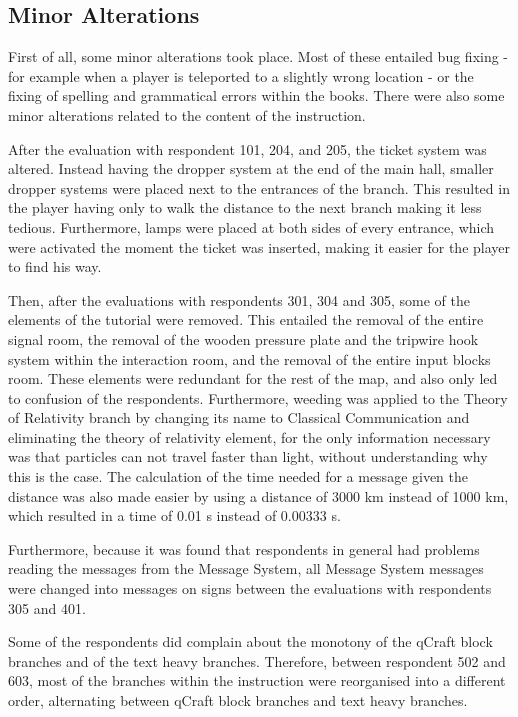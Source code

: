 \documentclass[11pt,twoside]{report} %
\begin{document}
\subsection{Minor Alterations}

First of all, some minor alterations took place. Most of these entailed bug fixing - for example when a player is teleported to a slightly wrong location - or the fixing of spelling and grammatical errors within the books. There were also some minor alterations related to the content of the instruction.

After the evaluation with respondent 101, 204, and 205, the ticket system was altered. Instead having the dropper system at the end of the main hall, smaller dropper systems were placed next to the entrances of the branch. This resulted in the player having only to walk the distance to the next branch making it less tedious. Furthermore, lamps were placed at both sides of every entrance, which were activated the moment the ticket was inserted, making it easier for the player to find his way.

Then, after the evaluations with respondents 301, 304 and 305, some of the elements of the tutorial were removed. This entailed the removal of the entire signal room, the removal of the wooden pressure plate and the tripwire hook system within the interaction room, and the removal of the entire input blocks room. These elements were redundant for the rest of the map, and also only led to confusion of the respondents. Furthermore, weeding was applied to the Theory of Relativity branch by changing its name to Classical Communication and eliminating the theory of relativity element, for the only information necessary was that particles can not travel faster than light, without understanding why this is the case. The calculation of the time needed for a message given the distance was also made easier by using a distance of 3000 km instead of 1000 km, which resulted in a time of 0.01 s instead of 0.00333 s.

Furthermore, because it was found that respondents in general had problems reading the messages from the Message System, all Message System messages were changed into messages on signs between the evaluations with respondents 305 and 401.

Some of the respondents did complain about the monotony of the qCraft block branches and of the text heavy branches. Therefore, between respondent 502 and 603, most of the branches within the instruction were reorganised into a different order, alternating between qCraft block branches and text heavy branches.
\end{document}
